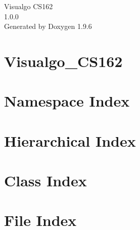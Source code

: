 \documentclass[twoside]{book}
\newcommand{\+}{\discretionary{\mbox{\scriptsize$\hookleftarrow$}}{}{}}
\newcommand{\clearemptydoublepage}{%
    \newpage{\pagestyle{empty}\cleardoublepage}%
  }
\begin{document}
  \raggedbottom
    \hypersetup{pageanchor=false,
                bookmarksnumbered=true,
                pdfencoding=unicode
               }
  \begin{titlepage}
  \vspace*{7cm}
  \begin{center}%
  {\Large Visualgo CS162}\\
  [1ex]\large 1.\+0.\+0 \\
  \vspace*{1cm}
  {\large Generated by Doxygen 1.9.6}\\
  \end{center}
  \end{titlepage}
  \clearemptydoublepage
  \tableofcontents
  \clearemptydoublepage
  \hypersetup{pageanchor=true}
\chapter{Visualgo\+\_\+\+CS162}
\label{md_README}

\chapter{Namespace Index}

\chapter{Hierarchical Index}

\chapter{Class Index}

\chapter{File Index}

\end{document}
